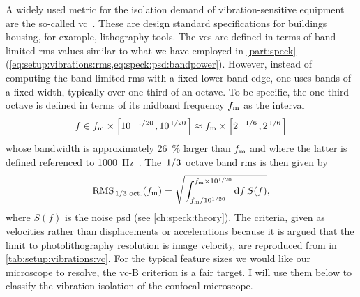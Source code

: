 A widely used metric for the isolation demand of vibration-sensitive equipment are the so-called \gls{vc}~\cite{Gordon1992,Gordon1999}.
These are design standard specifications for buildings housing, for example, lithography tools.
The \glspl{vc} are defined in terms of band-limited \gls{rms} values similar to what we have employed in \cref{part:speck} (\cf \cref{eq:setup:vibrations:rms,eq:speck:psd:bandpower}).
However, instead of computing the band-limited \gls{rms} with a fixed lower band edge, one uses bands of a fixed width, typically over one-third of an octave.
To be specific, the one-third octave is defined in terms of its midband frequency $f_{\mathrm{m}}$ as the interval
\begin{equation}\label{eq:setup:vibrations:third_octave}
    f\in f_{\mr{m}}\times\left[10^{-\flatfrac{1}{20}},10^{\flatfrac{1}{20}}\right] \approx f_{\mr{m}}\times\left[2^{-\flatfrac{1}{6}},2^{\flatfrac{1}{6}}\right]
\end{equation}
whose bandwidth \df is approximately \qty{26}{\percent} larger than $f_{\mathrm{m}}$ and where the latter is defined referenced to \qty{1000}{\hertz}~\cite{ansi_octave_bands}.
The $\flatfrac{1}{3}$ octave band \gls{rms} is then given by
\begin{equation}\label{eq:setup:vibrations:octave_band_rms}
    \rms_{\flatfrac{1}{3}\,\mr{oct.}}(f_{\mr{m}}) = \sqrt{\int_{f_{\mr{m}}/10^{1/20}}^{f_{\mr{m}}\times 10^{1/20}}\dd{f}S(f)},
\end{equation}
where $S(f)$ is the noise \gls{psd} (see \cref{ch:speck:theory}).
The criteria, given as velocities rather than displacements or accelerations because it is argued that the limit to photolithography resolution is image velocity, are reproduced from  in \cref{tab:setup:vibrations:vc}.
For the typical feature sizes we would like our microscope to resolve, the \acrshort{vc}-B criterion is a fair target.
I will use them below to classify the vibration isolation of the confocal microscope.

